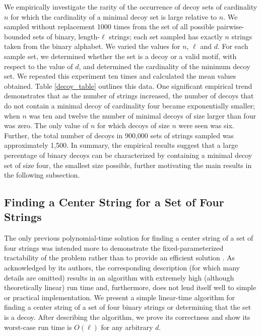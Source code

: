 We empirically investigate the rarity of the occurrence of decoy sets of cardinality $n$ for which the cardinality of a minimal decoy set is large relative to $n$. We sampled without replacement 1000 times from the set of all possible pairwise-bounded sets of binary, length-$\ell$ strings; each set sampled has exactly $n$ strings taken from the binary alphabet.  We varied the values for $n$, $\ell$ and $d$.  For each sample set, we determined whether the set is a decoy or a valid motif, with respect to the value of $d$, and determined the cardinality of the minimum decoy set.  We repeated this experiment ten times and calculated the mean values obtained. Table \ref{decoy_table} outlines this data. One significant empirical trend demonstrates that as the number of strings increased, the number of decoys that do not contain a minimal decoy of cardinality four became exponentially smaller; when $n$ was ten and twelve the number of minimal decoys of size larger than four was zero.  The only value of $n$ for which decoys of size $n$ were seen was six.  Further, the total number of decoys in 900,000 sets of strings sampled was approximately 1,500.  In summary, the empirical results suggest that a large percentage of binary decoys can be characterized by containing a minimal decoy set of size four, the smallest size possible, further motivating the main results in the following subsection.  

\subsection{Finding a Center String for a Set of Four Strings} \label{sec:alg}
 
The only previous polynomial-time solution for finding a center string of a set of four strings was intended more to demonstrate the fixed-parameterized tractability of the problem rather than to provide an efficient solution \cite{GNR03}. As acknowledged by its authors, the corresponding description (for which many details are omitted) results in an algorithm with extremely high  (although theoretically linear) run time and, furthermore, does not lend itself well to simple or practical implementation. We present a simple linear-time algorithm for finding a center string of a set of four binary strings or determining that the set is a decoy. After describing the algorithm, we prove its correctness and  show its worst-case run time is $O(\ell)$ for any arbitrary $d$.

